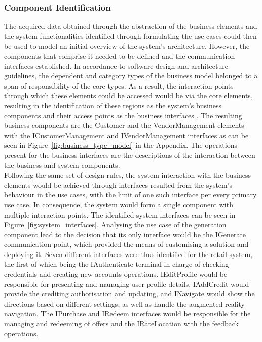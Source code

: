 \subsubsection{Component Identification}
The acquired data obtained through the abstraction of the business elements and the system functionalities identified through formulating the use cases could then be used to model an initial overview of the system's architecture. However, the components that comprise it needed to be defined and the communication interfaces established. In accordance to software design and architecture guidelines, the dependent and category types of the business model belonged to a span of responsibility of the core types. As a result, the interaction points through which these elements could be accessed would be via the core elements, resulting in the identification of these regions as the system's business components and their access points as the business interfaces \cite{hamza_2017}. The resulting business components are the Customer and the VendorManagement elements with the ICustomerManagement and IVendorManagement interfaces as can be seen in Figure~\ref{fig:business_type_model} in the Appendix. The operations present for the business interfaces are the descriptions of the interaction between the business and system components.\\

Following the same set of design rules, the system interaction with the business elements would be achieved through interfaces resulted from the system's behaviour in the use cases, with the limit of one such interface per every primary use case. In consequence, the system would form a single component with multiple interaction points. The identified system interfaces can be seen in Figure~\ref{fig:system_interfaces}. Analysing the use case of the generation component lead to the decision that its only interface would be the IGenerate communication point, which provided the means of customising a solution and deploying it. Seven different interfaces were thus identified for the retail system, the first of which being the IAuthenticate terminal in charge of checking credentials and creating new accounts operations. IEditProfile would be responsible for presenting and managing user profile details, IAddCredit would provide the crediting authorisation and updating, and INavigate would show the directions based on different settings, as well as handle the augmented reality navigation. The IPurchase and IRedeem interfaces would be responsible for the managing and redeeming of offers and the IRateLocation with the feedback operations.\\\\

